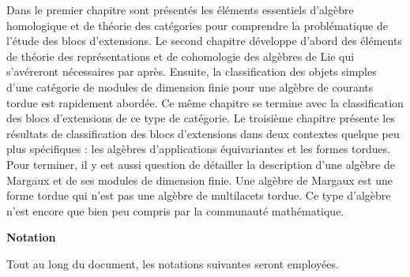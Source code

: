 Dans le premier chapitre sont présentés les éléments essentiels d'algèbre homologique et de théorie des catégories pour comprendre la problématique de l'étude des blocs d'extensions. Le second chapitre développe d'abord des éléments de théorie des représentations et de cohomologie des algèbres de Lie qui s'avéreront nécessaires par après. Ensuite, la classification des objets simples d'une catégorie de modules de dimension finie pour une algèbre de courants tordue est rapidement abordée. Ce même chapitre se termine avec la classification des blocs d'extensions de ce type de catégorie. Le troisième chapitre présente les résultats de classification des blocs d'extensions dans deux contextes quelque peu plus spécifiques : les algèbres d'applications équivariantes et les formes tordues. Pour terminer, il y est aussi question de détailler la description d'une algèbre de Margaux et de ses modules de dimension finie. Une algèbre de Margaux est une forme tordue qui n'est pas une algèbre de multilacets tordue. Ce type d'algèbre n'est encore que bien peu compris par la communauté mathématique.

%
\vspace{3ex}
\textbf{\large{Notation}}

Tout au long du document, les notations suivantes seront employées.

